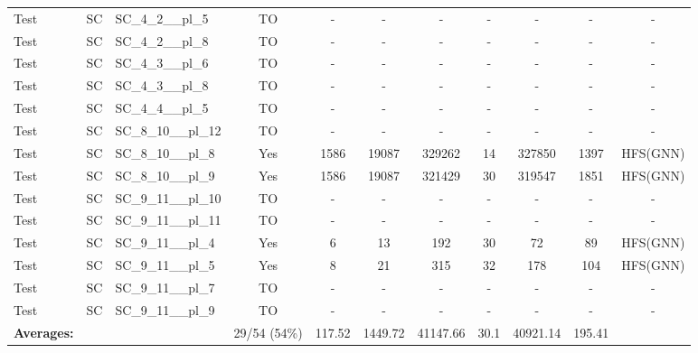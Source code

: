 \documentclass{article}
\begin{document}
\begin{tabular}{lllcccccccc}
Test & SC & SC\_4\_2\_\_pl\_5 & TO & - & - & - & - & - & - & - \\
Test & SC & SC\_4\_2\_\_pl\_8 & TO & - & - & - & - & - & - & - \\
Test & SC & SC\_4\_3\_\_pl\_6 & TO & - & - & - & - & - & - & - \\
Test & SC & SC\_4\_3\_\_pl\_8 & TO & - & - & - & - & - & - & - \\
Test & SC & SC\_4\_4\_\_pl\_5 & TO & - & - & - & - & - & - & - \\
Test & SC & SC\_8\_10\_\_pl\_12 & TO & - & - & - & - & - & - & - \\
Test & SC & SC\_8\_10\_\_pl\_8 & Yes & 1586 & 19087 & 329262 & 14 & 327850 & 1397 & HFS(GNN) \\
Test & SC & SC\_8\_10\_\_pl\_9 & Yes & 1586 & 19087 & 321429 & 30 & 319547 & 1851 & HFS(GNN) \\
Test & SC & SC\_9\_11\_\_pl\_10 & TO & - & - & - & - & - & - & - \\
Test & SC & SC\_9\_11\_\_pl\_11 & TO & - & - & - & - & - & - & - \\
Test & SC & SC\_9\_11\_\_pl\_4 & Yes & 6 & 13 & 192 & 30 & 72 & 89 & HFS(GNN) \\
Test & SC & SC\_9\_11\_\_pl\_5 & Yes & 8 & 21 & 315 & 32 & 178 & 104 & HFS(GNN) \\
Test & SC & SC\_9\_11\_\_pl\_7 & TO & - & - & - & - & - & - & - \\
Test & SC & SC\_9\_11\_\_pl\_9 & TO & - & - & - & - & - & - & - \\
\textbf{Averages:} & & & 29/54 (54\%) & 117.52 & 1449.72 & 41147.66 & 30.1 & 40921.14 & 195.41 & \\
\bottomrule
\end{tabular}
\newpage
\end{document}
